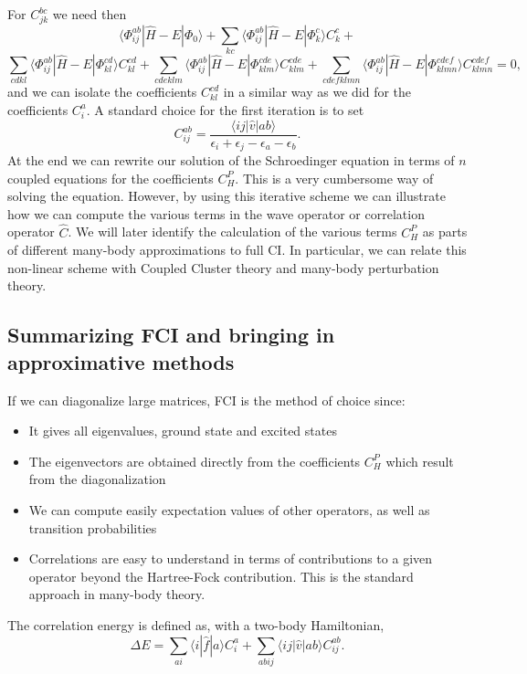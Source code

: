 \documentclass[%
oneside,                 %
final,                   %
10pt]{article}
\begin{document}
For $C_{jk}^{bc}$ we need then
\[
\langle \Phi_{ij}^{ab} | \hat{H} -E| \Phi_0\rangle + \sum_{kc}\langle \Phi_{ij}^{ab} | \hat{H} -E|\Phi_{k}^{c} \rangle C_{k}^{c}+
\]
\[
\sum_{cdkl}\langle \Phi_{ij}^{ab} | \hat{H} -E|\Phi_{kl}^{cd} \rangle C_{kl}^{cd}+\sum_{cdeklm}\langle \Phi_{ij}^{ab} | \hat{H} -E|\Phi_{klm}^{cde} \rangle C_{klm}^{cde}+\sum_{cdefklmn}\langle \Phi_{ij}^{ab} | \hat{H} -E|\Phi_{klmn}^{cdef} \rangle C_{klmn}^{cdef}=0,
\]
and we can isolate the coefficients $C_{kl}^{cd}$ in a similar way as we did for the coefficients $C_{i}^{a}$. 
A standard choice for the first iteration is to set 
\[
C_{ij}^{ab} =\frac{\langle ij \vert \hat{v} \vert ab \rangle}{\epsilon_i+\epsilon_j-\epsilon_a-\epsilon_b}.
\]
At the end we can rewrite our solution of the Schroedinger equation in terms of $n$ coupled equations for the coefficients $C_H^P$.
This is a very cumbersome way of solving the equation. However, by using this iterative scheme we can illustrate how we can compute the
various terms in the wave operator or correlation operator $\hat{C}$. We will later identify the calculation of the various terms $C_H^P$
as parts of different many-body approximations to full CI. In particular, we can  relate this non-linear scheme with Coupled Cluster theory and
many-body perturbation theory.


\subsection*{Summarizing FCI and bringing in approximative methods}


If we can diagonalize large matrices, FCI is the method of choice since:
\begin{itemize}
\item It gives all eigenvalues, ground state and excited states

\item The eigenvectors are obtained directly from the coefficients $C_H^P$ which result from the diagonalization

\item We can compute easily expectation values of other operators, as well as transition probabilities

\item Correlations are easy to understand in terms of contributions to a given operator beyond the Hartree-Fock contribution. This is the standard approach in  many-body theory. 
\end{itemize}

\noindent
The correlation energy is defined as, with a two-body Hamiltonian,  
\[
\Delta E=\sum_{ai}\langle i| \hat{f}|a \rangle C_{i}^{a}+
\sum_{abij}\langle ij | \hat{v}| ab \rangle C_{ij}^{ab}.
\]
\end{document}
